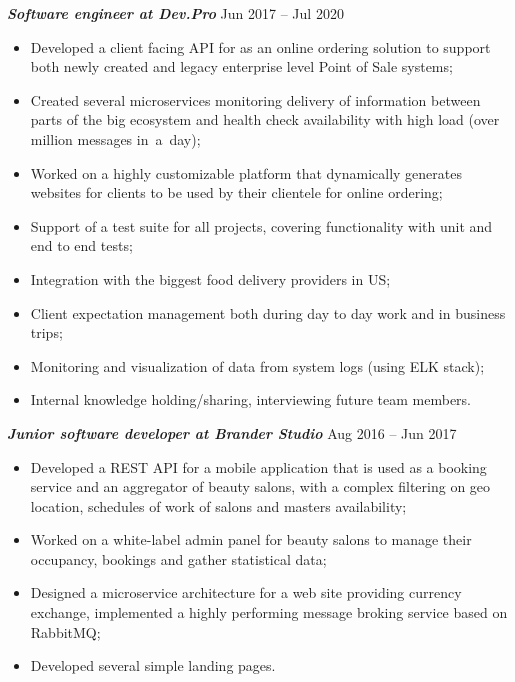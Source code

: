\documentclass[margin, 10pt]{res} %
\begin{document}
\begin{resume}
{\sl \bf  Software engineer at Dev.Pro } \hfill Jun 2017 -- Jul 2020
\vspace{3px}
 \begin{itemize}
 \item Developed a client facing API for as an online ordering solution to support both newly created and legacy enterprise level Point of Sale systems;
 \item Created several microservices monitoring delivery of information between parts of the big ecosystem and health check availability with high load (over million messages in~a~day);
 \item Worked on a highly customizable platform that dynamically generates websites for clients to be used by their clientele for online ordering;
 \item Support of a test suite for all projects, covering functionality with unit and end to end tests;
 \item Integration with the biggest food delivery providers in US;
 \item Client expectation management both during day to day work and in business trips;
 \item Monitoring and visualization of data from system logs (using ELK stack);
 \item Internal knowledge holding/sharing, interviewing future team members.
\end{itemize}

\newpage
{\sl \bf Junior software developer at Brander Studio} \hfill Aug 2016 -- Jun 2017
\vspace{3px}
\begin{itemize}
 \item Developed a REST API  for a mobile application that is used as a booking service and an aggregator of beauty salons, with a complex filtering on geo location, schedules of work of salons and masters availability;
 \item Worked on a white-label admin panel for beauty salons to manage their occupancy, bookings and gather statistical data;
 \item Designed a microservice architecture for a web site providing currency exchange, implemented a highly performing message broking service based on RabbitMQ;
 \item Developed several simple landing pages.
\end{itemize}


\end{resume}
\end{document}
